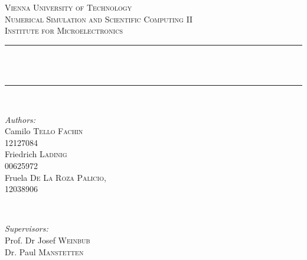 \begin{titlepage}

\newcommand{\HRule}{\rule{\linewidth}{0.5mm}} %

\center %
 

\textsc{\LARGE Vienna University of Technology}\\[1.5cm] %
\textsc{\Large Numerical Simulation and Scientific Computing II}\\[0.5cm] %
\textsc{\large Institute for Microelectronics }\\[0.5cm] %


\HRule \\[0.5cm]
{ \huge \bfseries \doctitle}\\[1mm] %
\HRule \\[0.5cm]
 

\begin{minipage}{0.4\textwidth}
\begin{flushleft} \large
\emph{Authors:}\\
Camilo \textsc{Tello Fachin}\\
12127084 \\
\vspace{3mm}
Friedrich \textsc{Ladinig}\\
00625972 \\
\vspace{3mm}
Fruela \textsc{De La Roza Palicio,}\\
12038906 
\end{flushleft}
\end{minipage}
~
\begin{minipage}{0.4\textwidth}
\begin{flushright} \large
\emph{Supervisors:} \\
Prof. Dr Josef \textsc{Weinbub} \\ %
Dr. Paul \textsc{Manstetten}
\end{flushright}
\end{minipage}\\[1.5cm]


\end{titlepage}
